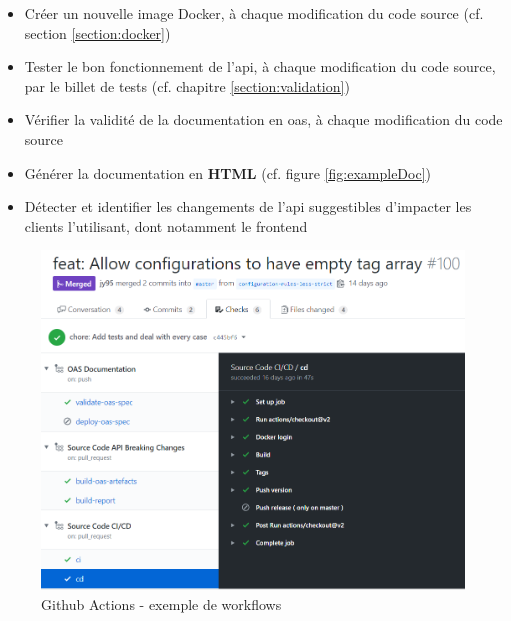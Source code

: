 \begin{itemize}[nosep,noitemsep,topsep=0pt,partopsep=0pt,after=\vspace*{2pt}]
    \item Créer un nouvelle image Docker, à chaque modification du code source (cf. section \ref{section:docker})
    \item Tester le bon fonctionnement de l'\Gls{api}, à chaque modification du code source, par le billet de tests (cf. chapitre \ref{section:validation})
    \item Vérifier la validité de la documentation en \Gls{oas}, à chaque modification du code source
    \item Générer la documentation en \textbf{HTML} (cf. figure \ref{fig:exampleDoc})
    \item Détecter et identifier les changements de l'\Gls{api} suggestibles d'impacter les clients l'utilisant, dont notamment le \gls{frontend}
\end{itemize}

\begin{figure}[H]
    \includegraphics[width=\textwidth,height=\textheight,keepaspectratio]{images/serveur/workflowGithubActions.PNG}
    \centering
    \caption{Github Actions - exemple de workflows}
    \label{fig:GithubActionsExample}
\end{figure}
